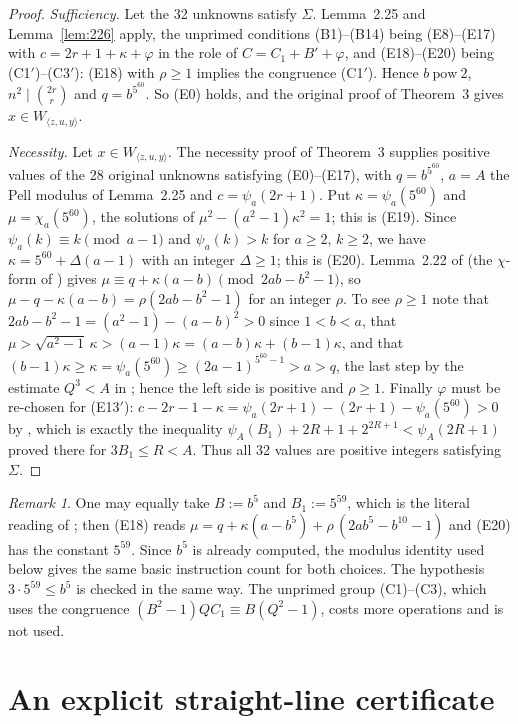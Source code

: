 \documentclass[11pt,letterpaper]{article}
\theoremstyle{definition}
\theoremstyle{remark}
\newtheorem{remark}[theorem]{Remark}
\numberwithin{equation}{section}
\newcommand{\pow}{\ \mathrm{pow}\ }
\begin{document}
\begin{proof}
\emph{Sufficiency.} Let the 32 unknowns satisfy $\Sigma$. Lemma~2.25 and
Lemma~\ref{lem:226} apply, the unprimed conditions (B1)--(B14) being
(E8)--(E17) with $c=2r+1+\kappa+\varphi$ in the role of $C=C_1+B'+\varphi$,
and (E18)--(E20) being (C1$'$)--(C3$'$): (E18) with $\rho\ge1$ implies the
congruence (C1$'$). Hence $b\pow2$, $n^2\mid\binom{2r}{r}$ and $q=b^{5^{60}}$.
So (E0) holds, and the original proof of Theorem~3 gives
$x\in W_{\langle z,u,y\rangle}$.

\emph{Necessity.} Let $x\in W_{\langle z,u,y\rangle}$. The necessity proof of
Theorem~3 supplies positive values of the 28 original unknowns satisfying
(E0)--(E17), with $q=b^{5^{60}}$, $a=A$ the Pell modulus of Lemma~2.25 and
$c=\psi_a(2r+1)$. Put $\kappa=\psi_a(5^{60})$ and $\mu=\chi_a(5^{60})$, the
solutions of $\mu^2-(a^2-1)\kappa^2=1$; this is (E19). Since
$\psi_a(k)\equiv k\pmod{a-1}$ and $\psi_a(k)>k$ for $a\ge2$, $k\ge2$, we have
$\kappa=5^{60}+\Delta(a-1)$ with an integer $\Delta\ge1$; this is (E20).
Lemma~2.22 of \cite{J82} (the $\chi$-form of \cite[Remark after Lemma
2.28]{J82}) gives $\mu\equiv q+\kappa(a-b)\pmod{2ab-b^2-1}$, so
$\mu-q-\kappa(a-b)=\rho(2ab-b^2-1)$ for an integer $\rho$. To see $\rho\ge1$
note that $2ab-b^2-1=(a^2-1)-(a-b)^2>0$ since $1<b<a$, that
$\mu>\sqrt{a^2-1}\,\kappa>(a-1)\kappa=(a-b)\kappa+(b-1)\kappa$, and that
$(b-1)\kappa\ge\kappa=\psi_a(5^{60})\ge(2a-1)^{5^{60}-1}>a>q$, the last step
by the estimate $Q^3<A$ in \cite[(13)]{J82}; hence the left side is positive
and $\rho\ge1$. Finally $\varphi$ must be re-chosen for (E13$'$):
$c-2r-1-\kappa=\psi_a(2r+1)-(2r+1)-\psi_a(5^{60})>0$ by
\cite[(14)]{J82}, which is exactly the inequality
$\psi_A(B_1)+2R+1+2^{2R+1}<\psi_A(2R+1)$ proved there for $3B_1\le R<A$.
Thus all 32 values are positive integers satisfying $\Sigma$.
\end{proof}

\begin{remark}
One may equally take $B:=b^5$ and $B_1:=5^{59}$, which is the literal reading
of \cite[\S4]{J82}; then (E18) reads
$\mu=q+\kappa(a-b^5)+\rho\,(2ab^5-b^{10}-1)$ and (E20) has the constant
$5^{59}$. Since $b^5$ is already computed, the modulus identity used below
gives the same basic instruction count for both choices. The hypothesis
$3\cdot5^{59}\le b^5$ is checked in the same way. The unprimed
group (C1)--(C3), which uses the congruence
$(B^2-1)QC_1\equiv B(Q^2-1)$, costs more operations and is not used.
\end{remark}

\section{An explicit straight-line certificate}\label{sec:certificate}
\end{document}
